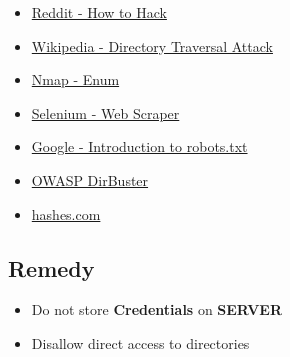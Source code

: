 \begin{itemize}
    \item \href{https://www.reddit.com/r/HowToHack/comments/2030df/find_hidden_files_on_a_website/}{Reddit - How to Hack}
    \item \href{https://en.wikipedia.org/wiki/Directory\_traversal\_attack}{Wikipedia - Directory Traversal Attack}
    \item \href{https://nmap.org/nsedoc/scripts/http-enum.html}{Nmap - Enum}
    \item \href{https://towardsdatascience.com/web-scraping-using-selenium-python-8a60f4cf40ab}{Selenium - Web Scraper}
    \item \href{https://support.google.com/webmasters/answer/6062608?hl=en}{Google - Introduction to robots.txt}
    \item \href{https://tools.kali.org/web-applications/dirbuster}{OWASP DirBuster}
    \item \href{https://hashes.com/en/decrypt/hash}{hashes.com}
\end{itemize}

\subsection{Remedy}

\begin{itemize}
    \item Do not store \textbf{Credentials} on \textbf{SERVER}
    \item Disallow direct access to directories
\end{itemize}
